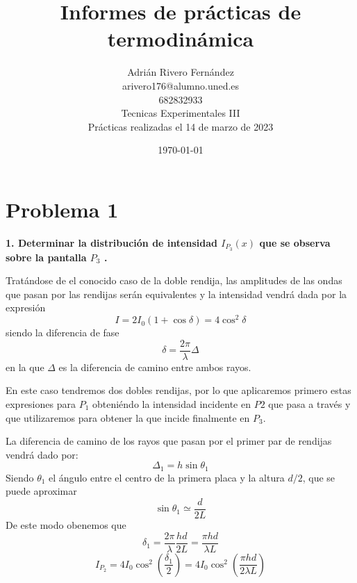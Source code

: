 \documentclass[a4paper,12pt,spanish]{article}
\begin{document}
\title{\Huge Informes de prácticas de termodinámica}

\author
{
	Adrián Rivero Fernández%
	\\arivero176@alumno.uned.es
	\\682832933
	\\ Tecnicas Experimentales III
	\\ Prácticas realizadas el 14 de marzo de 2023
}





\date{\today}



\maketitle



\section*{Problema 1}
\textbf{ 1. Determinar la distribución de intensidad $I_{P_3}(x)$ que se observa sobre la pantalla $P_3$ .
}
\vspace{\baselineskip}

Tratándose de el conocido caso de la doble rendija, las amplitudes de las ondas que pasan por las rendijas serán equivalentes y la intensidad vendrá dada por la expresión
\[ I = 2 I_0 (1+\cos\delta) = 4 \cos^2\delta
\]
siendo la diferencia de fase
\[ \delta = \frac{2 \pi}{\lambda} \Delta
\]
en la que $\Delta$ es la diferencia de camino entre ambos rayos.

En este caso tendremos dos dobles rendijas, por lo que aplicaremos primero estas expresiones para $P_1$ obteniéndo la intensidad incidente en $P2$ que pasa a través y que utilizaremos para obtener la que incide finalmente en $P_3$.

La diferencia de camino de los rayos que pasan por el primer par de rendijas vendrá dado por:
\[ \Delta_1 = h \sin\theta_1
\]
Siendo $\theta_1$ el ángulo entre el centro de la primera placa y la altura $d/2$, que se puede aproximar
\[ \sin\theta_1 \simeq \frac{d}{2L}
\]
De este modo obenemos que 
\[ \delta_1 =  \frac{2 \pi}{\lambda} \frac{hd}{2L} = \frac{\pi hd}{\lambda L}
\]
\[ I_{P_2} = 4I_0 \cos^2(\frac{\delta_1}{2}) = 4I_0 \cos^2(\frac{\pi hd}{2\lambda L})
\]
\end{document}
